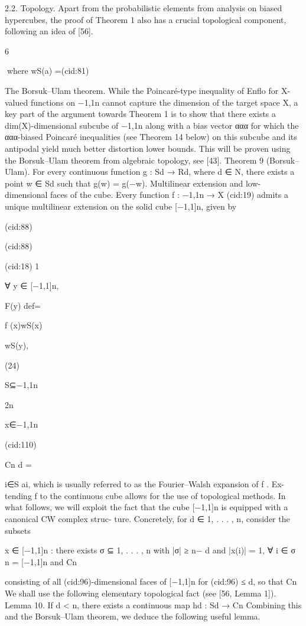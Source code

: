 {2.2. Topology. Apart from the probabilistic elements from analysis on biased hypercubes, the
proof of Theorem 1 also has a crucial topological component, following an idea of [56].

6

where wS(a) =(cid:81)

The Borsuk–Ulam theorem. While the Poincaré-type inequality of Enﬂo for X-valued functions
on {−1,1}n cannot capture the dimension of the target space X, a key part of the argument
towards Theorem 1 is to show that there exists a dim(X)-dimensional subcube of {−1,1}n along
with a bias vector ααα for which the ααα-biased Poincaré inequalities (see Theorem 14 below) on
this subcube and its antipodal yield much better distortion lower bounds. This will be proven
using the Borsuk–Ulam theorem from algebraic topology, see [43].
Theorem 9 (Borsuk–Ulam). For every continuous function g : Sd → Rd, where d ∈ N, there exists
a point w ∈ Sd such that g(w) = g(−w).
Multilinear extension and low-dimensional faces of the cube. Every function f : {−1,1}n → X
(cid:19)
admits a unique multilinear extension on the solid cube [−1,1]n, given by

(cid:88)

(cid:88)

(cid:18) 1

∀ y ∈ [−1,1]n,

F(y) def=

f (x)wS(x)

wS(y),

(24)

S⊆{−1,1}n

2n

x∈{−1,1}n

(cid:110)

Cn
d =

i∈S ai, which is usually referred to as the Fourier–Walsh expansion of f . Ex-
tending f to the continuous cube allows for the use of topological methods. In what follows,
we will exploit the fact that the cube [−1,1]n is equipped with a canonical CW complex struc-
ture. Concretely, for d ∈ {1, . . . , n}, consider the subsets

x ∈ [−1,1]n : there exists σ ⊆ {1, . . . , n} with |σ| ≥ n− d and |x(i)| = 1, ∀ i ∈ σ
n = [−1,1]n and Cn

consisting of all (cid:96)-dimensional faces of [−1,1]n for (cid:96) ≤ d, so that Cn
We shall use the following elementary topological fact (see [56, Lemma 1]).
Lemma 10. If d < n, there exists a continuous map hd : Sd → Cn
Combining this and the Borsuk–Ulam theorem, we deduce the following useful lemma.

}
